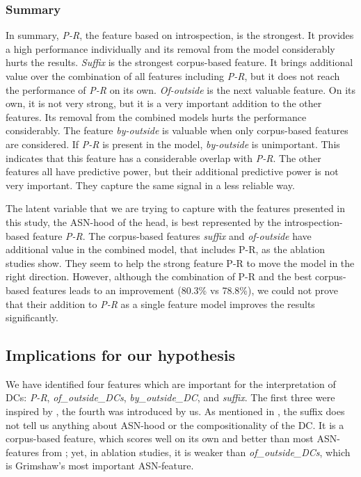 \documentclass[output=paper]{langsci/langscibook}
\begin{document}
\subsubsection{Summary}
In summary, \textit{P-R}, the feature based on introspection, is the strongest. It provides a high performance individually and its removal from the model considerably hurts the results. \textit{Suffix} is the strongest corpus-based feature. It brings additional value over the combination of all features including  \textit{P-R}, but it does not reach the performance of \textit{P-R} on its own. \textit{Of-outside} is the next valuable feature. On its own, it is not very strong, but it is a very important addition to the other features. Its removal from the combined models hurts the performance considerably. The feature \textit{by-outside} is valuable when only corpus-based features are considered. If \textit{P-R }is present in the model, \textit{by-outside} is unimportant. This indicates that this feature has a considerable overlap with \textit{P-R}. The other features all have predictive power, but their additional predictive power is not very important. They capture the same signal in a less reliable way.

The latent variable that we are trying to capture with the features presented in this study, the ASN-hood of the head, is best represented by the introspection-based feature \textit{P-R}. The corpus-based features \textit{suffix} and \textit{of-outside} have additional value in the combined model, that includes P-R, as the ablation studies show. They seem to help the strong feature P-R to move the model in the right direction. However, although the combination of P-R and the best corpus-based features leads to an improvement (80.3\% vs 78.8\%), we could not prove that their addition to \textit{P-R} as a single feature model improves the results significantly.

\subsection{Implications for our hypothesis}\label{sec:discussion-hypothesis}


We have identified four features which are important for the interpretation of DCs: \textit{P-R}, \textit{of\_outside\_DCs}, \textit{by\_outside\_DC}, and \textit{suffix}. The first three were inspired by \cite{grimshaw:90}, the fourth was introduced by us. As mentioned in , the suffix does not tell us anything about ASN-hood or the compositionality of the DC. It is a corpus-based feature, which scores well on its own and better than most ASN-features from \cite{grimshaw:90}; yet, in ablation studies, it is weaker than \textit{of\_outside\_DCs}, which is Grimshaw's most important ASN-feature.
\end{document}
